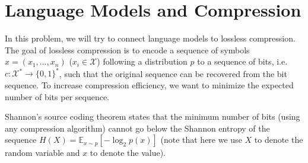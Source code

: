 \documentclass{article}
\theoremstyle{case}
\theoremstyle{definition}
\begin{document}
\section{Language Models and Compression}

In this problem, we will try to connect language models to lossless compression.
The goal of lossless compression is to encode a sequence of symbols $x=(x_1,\ldots, x_n)$ ($x_i\in\mathcal{X}$) following a distribution $p$ to a sequence of bits, i.e.\ $c: \mathcal{X}^* \to \{0,1\}^*$,
such that the original sequence can be recovered from the bit sequence.
To increase compression efficiency, we want to minimize the expected number of bits per sequence.

Shannon's source coding theorem states that the minimum number of bits (using any compression algorithm) cannot go below the Shannon entropy of the sequence $H(X)=\mathbb{E}_{x\sim p}[-\log_2 p(x)]$ (note that here we use $X$ to denote the random variable and $x$ to denote the value).
\end{document}
